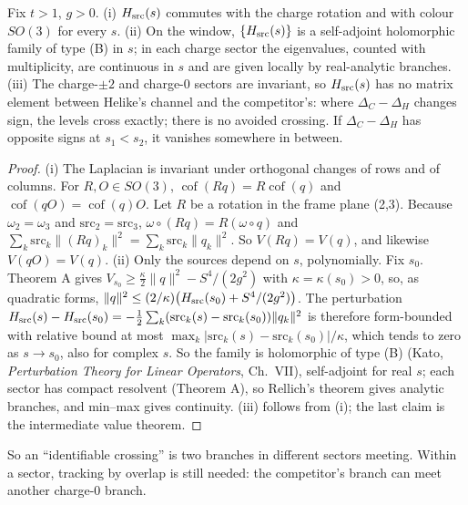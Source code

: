 \begin{proposition}\label{prop:V-crossing}
Fix $t>1$, $g>0$. (i) $H_{\rm src}(s)$ commutes with the charge rotation and with colour $SO(3)$ for every $s$.
(ii) On the window, $\{H_{\rm src}(s)\}$ is a self-adjoint holomorphic family of type (B) in $s$; in each charge
sector the eigenvalues, counted with multiplicity, are continuous in $s$ and are given locally by real-analytic
branches. (iii) The charge-$\pm2$ and charge-0 sectors are invariant, so $H_{\rm src}(s)$ has no matrix element
between Helike's channel and the competitor's: where $\Delta_C-\Delta_H$ changes sign, the levels cross exactly; there
is no avoided crossing. If $\Delta_C-\Delta_H$ has opposite signs at $s_1<s_2$, it vanishes somewhere in between.
\end{proposition}
\begin{proof}
(i) The Laplacian is invariant under orthogonal changes of rows and of columns. For $R,O\in SO(3)$, $\operatorname{cof}(Rq)=R\operatorname{cof}(q)$ and $\operatorname{cof}(qO)=\operatorname{cof}(q)O$.
Let $R$ be a rotation in the frame plane (2,3). Because $\omega_2=\omega_3$ and $\mathrm{src}_2=\mathrm{src}_3$,
$\omega\circ(Rq)=R(\omega\circ q)$ and $\sum_k\mathrm{src}_k\|(Rq)_k\|^2=\sum_k\mathrm{src}_k\|q_k\|^2$. So
$V(Rq)=V(q)$, and likewise $V(qO)=V(q)$. (ii) Only the sources depend on $s$, polynomially. Fix $s_0$. Theorem A gives $V_{s_0}\geq\frac{\kappa}{2}\|q\|^2-S^4/(2g^2)$ with $\kappa=\kappa(s_0)>0$, so, as quadratic forms,
$\|q\|^2\leq(2/\kappa)\bigl(H_{\rm src}(s_0)+S^4/(2g^2)\bigr)$. The perturbation
$H_{\rm src}(s)-H_{\rm src}(s_0)=-\frac12\sum_k(\mathrm{src}_k(s)-\mathrm{src}_k(s_0))\|q_k\|^2$ is therefore
form-bounded with relative bound at most $\max_k|\mathrm{src}_k(s)-\mathrm{src}_k(s_0)|/\kappa$, which tends to zero as
$s\to s_0$, also for complex $s$. So the family is holomorphic of type (B) (Kato, \emph{Perturbation Theory for Linear
Operators}, Ch.~VII), self-adjoint for real $s$; each sector has compact resolvent (Theorem A), so Rellich's theorem
gives analytic branches, and min--max gives continuity. (iii) follows from (i); the last claim is the intermediate
value theorem.
\end{proof}

So an ``identifiable crossing'' is two branches in different sectors meeting. Within a sector, tracking by overlap is
still needed: the competitor's branch can meet another charge-0 branch.

